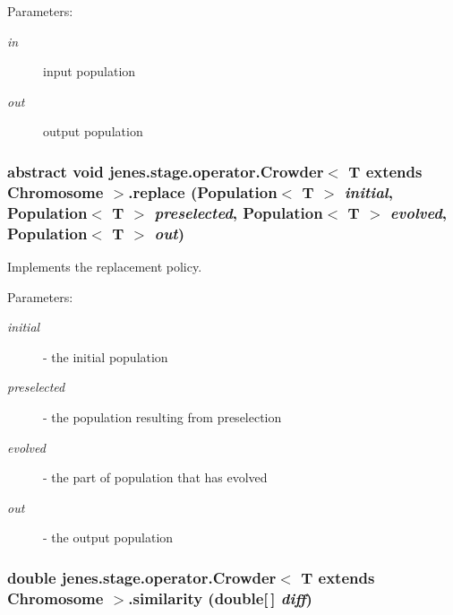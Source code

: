 \begin{Desc}
\item[Parameters:]
\begin{description}
\item[{\em in}]input population \item[{\em out}]output population \end{description}
\end{Desc}
\hypertarget{classjenes_1_1stage_1_1operator_1_1_crowder_3_01_t_01extends_01_chromosome_01_4_2eec13cd60faaeefc6bb00302831740f}{
\subsubsection[replace]{\setlength{\rightskip}{0pt plus 5cm}abstract void jenes.stage.operator.Crowder$<$ T extends Chromosome $>$.replace (Population$<$ T $>$ {\em initial}, \/  Population$<$ T $>$ {\em preselected}, \/  Population$<$ T $>$ {\em evolved}, \/  Population$<$ T $>$ {\em out})}}
\label{classjenes_1_1stage_1_1operator_1_1_crowder_3_01_t_01extends_01_chromosome_01_4_2eec13cd60faaeefc6bb00302831740f}


Implements the replacement policy.

\begin{Desc}
\item[Parameters:]
\begin{description}
\item[{\em initial}]- the initial population \item[{\em preselected}]- the population resulting from preselection \item[{\em evolved}]- the part of population that has evolved \item[{\em out}]- the output population \end{description}
\end{Desc}
\hypertarget{classjenes_1_1stage_1_1operator_1_1_crowder_3_01_t_01extends_01_chromosome_01_4_99b3aaad504589efa9c408fc1b4e2fa1}{
\subsubsection[similarity]{\setlength{\rightskip}{0pt plus 5cm}double jenes.stage.operator.Crowder$<$ T extends Chromosome $>$.similarity (double\mbox{[}$\,$\mbox{]} {\em diff})}}
\label{classjenes_1_1stage_1_1operator_1_1_crowder_3_01_t_01extends_01_chromosome_01_4_99b3aaad504589efa9c408fc1b4e2fa1}


